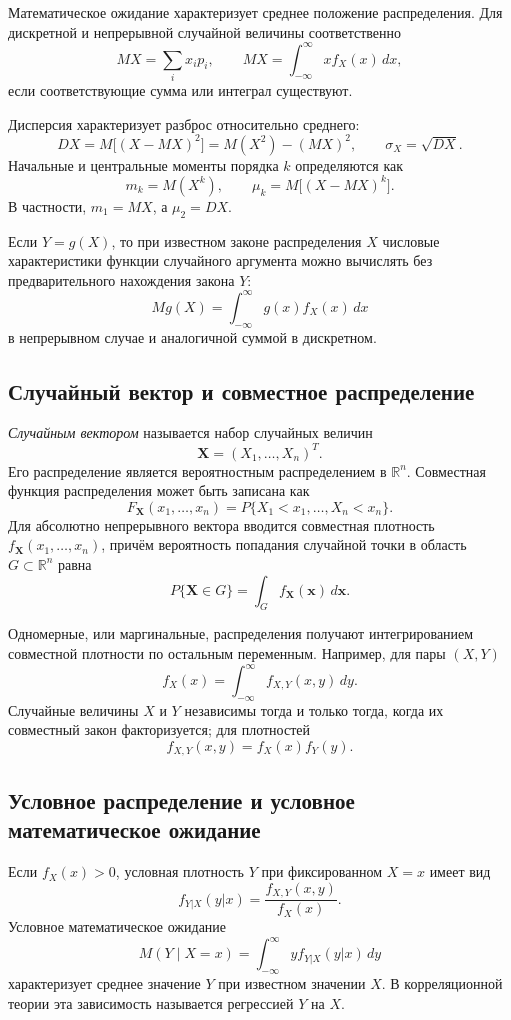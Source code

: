 Математическое ожидание характеризует среднее положение распределения. Для
дискретной и непрерывной случайной величины соответственно
\[
    M X=\sum_i x_i p_i,
    \qquad
    M X=\int_{-\infty}^{\infty}x f_X(x)\,dx,
\]
если соответствующие сумма или интеграл существуют.

Дисперсия характеризует разброс относительно среднего:
\[
    D X=M\bigl[(X-MX)^2\bigr]
       =M(X^2)-(MX)^2,
    \qquad
    \sigma_X=\sqrt{DX}.
\]
Начальные и центральные моменты порядка $k$ определяются как
\[
    m_k=M(X^k),\qquad
    \mu_k=M\bigl[(X-MX)^k\bigr].
\]
В частности, $m_1=MX$, а $\mu_2=DX$.

Если $Y=g(X)$, то при известном законе распределения $X$ числовые
характеристики функции случайного аргумента можно вычислять без предварительного
нахождения закона $Y$:
\[
    M g(X)=\int_{-\infty}^{\infty}g(x)f_X(x)\,dx
\]
в непрерывном случае и аналогичной суммой в дискретном.

\subsection{Случайный вектор и совместное распределение}

\emph{Случайным вектором} называется набор случайных величин
\[
    \mathbf X=(X_1,\ldots,X_n)^T.
\]
Его распределение является вероятностным распределением в $\mathbb R^n$.
Совместная функция распределения может быть записана как
\[
    F_{\mathbf X}(x_1,\ldots,x_n)
    =P\{X_1<x_1,\ldots,X_n<x_n\}.
\]
Для абсолютно непрерывного вектора вводится совместная плотность
$f_{\mathbf X}(x_1,\ldots,x_n)$, причём вероятность попадания случайной точки
в область $G\subset\mathbb R^n$ равна
\[
    P\{\mathbf X\in G\}
    =\int_G f_{\mathbf X}(\mathbf x)\,d\mathbf x.
\]

Одномерные, или маргинальные, распределения получают интегрированием совместной
плотности по остальным переменным. Например, для пары $(X,Y)$
\[
    f_X(x)=\int_{-\infty}^{\infty}f_{X,Y}(x,y)\,dy.
\]
Случайные величины $X$ и $Y$ независимы тогда и только тогда, когда их
совместный закон факторизуется; для плотностей
\[
    f_{X,Y}(x,y)=f_X(x)f_Y(y).
\]

\subsection{Условное распределение и условное математическое ожидание}

Если $f_X(x)>0$, условная плотность $Y$ при фиксированном $X=x$ имеет вид
\[
    f_{Y|X}(y|x)=\frac{f_{X,Y}(x,y)}{f_X(x)}.
\]
Условное математическое ожидание
\[
    M(Y\mid X=x)=\int_{-\infty}^{\infty}y f_{Y|X}(y|x)\,dy
\]
характеризует среднее значение $Y$ при известном значении $X$. В корреляционной
теории эта зависимость называется регрессией $Y$ на $X$.

